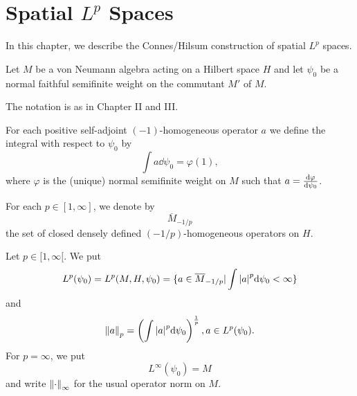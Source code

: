
% 
\chapter{Spatial $L^p$ Spaces}
In this chapter, we describe the Connes/Hilsum construction of spatial $L^p$ spaces. \par
Let $M$ be a von Neumann algebra acting on a Hilbert space $H$ and let $\psi_0$ be a normal faithful semifinite weight on the commutant $M'$ of $M$.\par
The notation is as in Chapter II and III.
\begin{definition}
    For each positive self-adjoint $(-1)$-homogeneous operator $a$ we define the integral with respect to $\psi_0$ by
    \begin{equation}
        \int a\dd \psi_0=\varphi(1),
    \end{equation}
    where $\varphi$ is the (unique) normal semifinite weight on $M$ such that $a=\dv{\varphi}{\psi_0}$.
\end{definition}
\begin{notation}
    For each $p\in [1,\infty]$, we denote by
    \[
        \overline{M}_{-1/p}
    \]
    the set of closed densely defined $(-1/p)$-homogeneous operators on $H$.
\end{notation}
\begin{definition}
    Let $p\in[1,\infty[$. We put
    \begin{equation}\label{Chap4: Eqn: 2}
        L^p(\psi_0)=L^p(M,H,\psi_0)=\{a\in \overline{M}_{-1/p} |\int\abs{a}^p\dd \psi_0<\infty\}
    \end{equation}
    and
    \begin{equation}
        \norm{a}_p=\left( \int\abs{a}^p\dd \psi_0 \right)^\frac{1}{p},a\in L^p(\psi_0).
    \end{equation}
    For $p = \infty$, we put
    \begin{equation}
        L^\infty(\psi_0)=M
    \end{equation}
    and write $\norm{\cdot}_\infty$ for the usual operator norm on $M$.
\end{definition}
